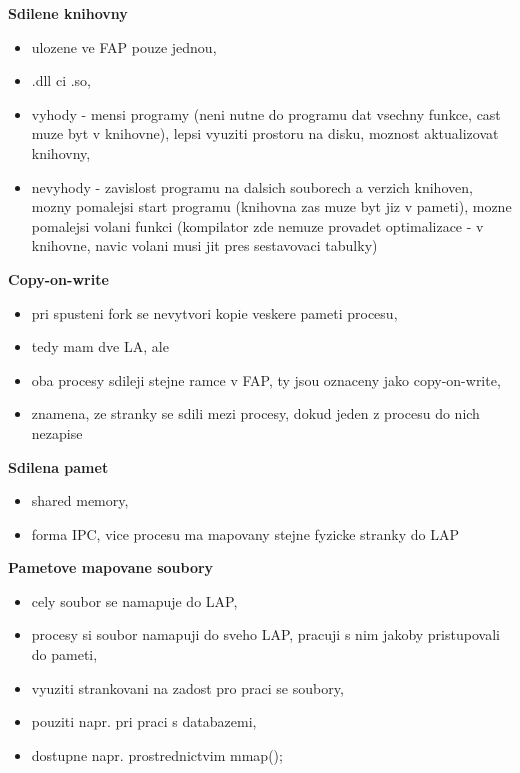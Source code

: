 \documentclass[a4paper, 11pt]{article}
\begin{document}
\textbf{Sdilene knihovny}
\begin{itemize}
    \item ulozene ve FAP pouze jednou,
    \item .dll ci .so,
    \item vyhody - mensi programy (neni nutne do programu dat vsechny funkce, cast muze byt v knihovne), lepsi vyuziti prostoru na disku, moznost aktualizovat knihovny,
    \item nevyhody - zavislost programu na dalsich souborech a verzich knihoven, mozny pomalejsi start programu (knihovna zas muze byt jiz v pameti), mozne pomalejsi volani funkci (kompilator zde nemuze provadet optimalizace - v knihovne, navic volani musi jit pres sestavovaci tabulky) \\
\end{itemize}

\textbf{Copy-on-write}
\begin{itemize}
    \item pri spusteni fork se nevytvori kopie veskere pameti procesu,
    \item tedy mam dve LA, ale
    \item oba procesy sdileji stejne ramce v FAP, ty jsou oznaceny jako copy-on-write,
    \item znamena, ze stranky se sdili mezi procesy, dokud jeden z procesu do nich nezapise \\
\end{itemize}

\textbf{Sdilena pamet}
\begin{itemize}
    \item shared memory,
    \item forma IPC, vice procesu ma mapovany stejne fyzicke stranky do LAP \\
\end{itemize}

\textbf{Pametove mapovane soubory}
\begin{itemize}
    \item cely soubor se namapuje do LAP,
    \item procesy si soubor namapuji do sveho LAP, pracuji s nim jakoby pristupovali do pameti,
    \item vyuziti strankovani na zadost pro praci se soubory,
    \item pouziti napr. pri praci s databazemi,
    \item dostupne napr. prostrednictvim mmap(); \\
\end{itemize}
\end{document}
